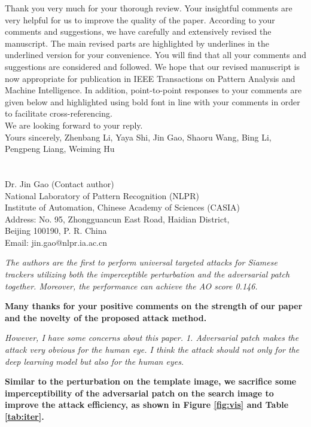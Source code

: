 \documentclass[12pt]{article}
\begin{document}
Thank you very much for your thorough review. Your insightful comments are very helpful for us to improve the quality of the paper. According to your comments and suggestions, we have carefully and extensively revised the manuscript. The main revised parts are highlighted by underlines in the underlined version for your convenience. You will find that all your comments and suggestions are considered and followed. We hope that our revised manuscript is now appropriate for publication in IEEE Transactions on Pattern Analysis and Machine Intelligence.
In addition, point-to-point responses to your comments are given below and highlighted using bold font in line with your comments in order to facilitate cross-referencing.\\[10pt]
\indent We are looking forward to your reply.\\[10pt]
\noindent Yours sincerely,
\noindent Zhenbang Li, Yaya Shi, Jin Gao, Shaoru Wang, Bing Li, Pengpeng Liang, Weiming Hu
\\
\\
\\
\noindent Dr. Jin Gao (Contact author)\\
\noindent National Laboratory of Pattern Recognition (NLPR)\\
\noindent Institute of Automation, Chinese Academy of Sciences (CASIA)\\
\noindent Address: No. 95, Zhongguancun East Road, Haidian District,\\
\noindent Beijing 100190, P. R. China\\
\noindent Email: jin.gao@nlpr.ia.ac.cn

\newpage
\textit{The authors are the first to perform universal targeted attacks for Siamese trackers utilizing both the imperceptible perturbation and the adversarial patch together. Moreover, the performance can achieve the AO score 0.146.}

\textbf{Many thanks for your positive comments on the strength of our paper and the novelty of the proposed attack method.}

\textit{However, I have some concerns about this paper. 1. Adversarial patch makes the attack very obvious for the human eye. I think the attack should not only for the deep learning model but also for the human eyes.}

\textbf{
Similar to the perturbation on the template image, we sacrifice some imperceptibility of the adversarial patch on the search image to improve the attack efficiency, as shown in Figure \ref{fig:vis} and Table \ref{tab:iter}.}
\end{document}
